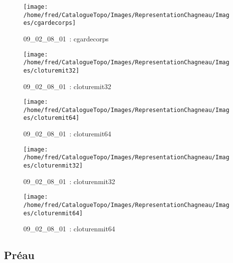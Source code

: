 \documentclass[12pt,titlepage]{book}
\begin{document}
\begin{figure}[h!]
  \begin{minipage}[t]{3cm}
    \begin{center}
      \texttt{[image: /home/fred/CatalogueTopo/Images/RepresentationChagneau/Images/cgardecorps]}
      \caption[~09\_02\_08\_01]{\small{09\_02\_08\_01~:} \tiny{cgardecorps}}\label{cgardecorps}
    \end{center}
  \end{minipage}
  \begin{minipage}[t]{3cm}
    \begin{center}
      \texttt{[image: /home/fred/CatalogueTopo/Images/RepresentationChagneau/Images/cloturemit32]}
      \caption[~09\_02\_08\_01]{\small{09\_02\_08\_01~:} \tiny{cloturemit32}}\label{cloturemit32}
    \end{center}
  \end{minipage}
  \begin{minipage}[t]{3cm}
    \begin{center}
      \texttt{[image: /home/fred/CatalogueTopo/Images/RepresentationChagneau/Images/cloturemit64]}
      \caption[~09\_02\_08\_01]{\small{09\_02\_08\_01~:} \tiny{cloturemit64}}\label{cloturemit64}
    \end{center}
  \end{minipage}
  \begin{minipage}[t]{3cm}
    \begin{center}
      \texttt{[image: /home/fred/CatalogueTopo/Images/RepresentationChagneau/Images/cloturenmit32]}
      \caption[~09\_02\_08\_01]{\small{09\_02\_08\_01~:} \tiny{cloturenmit32}}\label{cloturenmit32}
    \end{center}
  \end{minipage}
  \begin{minipage}[t]{3cm}
    \begin{center}
      \texttt{[image: /home/fred/CatalogueTopo/Images/RepresentationChagneau/Images/cloturenmit64]}
      \caption[~09\_02\_08\_01]{\small{09\_02\_08\_01~:} \tiny{cloturenmit64}}\label{cloturenmit64}
    \end{center}
  \end{minipage}
\end{figure}


\subsection{Préau}
\noindent
\vspace{\baselineskip}
\end{document}
